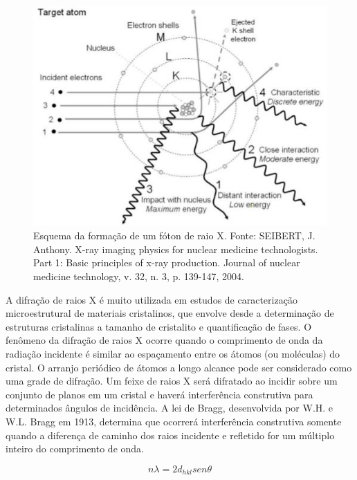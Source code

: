 \documentclass[article,12pt,openright,oneside,a4paper,brazil]{abntex2}
\begin{document}
\begin{figure}[H]
    \centering
    \includegraphics[scale=0.7]{Figuras/raiosX.jpg}
    \caption{Esquema da formação de um fóton de raio X. Fonte: SEIBERT, J. Anthony. X-ray imaging physics for nuclear medicine technologists. Part 1: Basic principles of x-ray production. Journal of nuclear medicine technology, v. 32, n. 3, p. 139-147, 2004.}
    \label{fig:ex}
\end{figure}
 
A difração de raios X é muito utilizada em estudos de caracterização microestrutural de materiais cristalinos, que envolve desde a determinação de estruturas cristalinas a tamanho de cristalito e quantificação de fases.
O fenômeno da difração de raios X ocorre quando o comprimento de onda da radiação incidente é similar ao espaçamento entre os átomos (ou moléculas) do cristal. O arranjo periódico de átomos a longo alcance pode ser considerado como uma grade de difração. Um feixe de raios X será difratado ao incidir sobre um conjunto de planos em um cristal e haverá interferência construtiva para determinados ângulos de incidência. A lei de Bragg, desenvolvida por W.H. e W.L. Bragg em 1913, determina que ocorrerá interferência construtiva somente quando a diferença de caminho dos raios incidente e refletido for um múltiplo inteiro do comprimento de onda.

\begin{equation}
n\lambda = 2d_{hkl}sen\theta
\end{equation}
\end{document}
